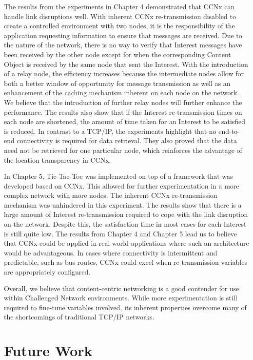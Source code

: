 \documentclass[a4paper,12pt]{report}      %
\begin{document}
The results from the experiments in Chapter 4 demonstrated that CCNx can handle link disruptions well. With inherent CCNx re-transmission
disabled to create a controlled environment with two nodes, it is the responsibility of the application requesting information to ensure that messages are received. Due to the nature of the network, there is no way to verify that Interest messages have been received by the other node except for when the corresponding Content Object is received by the same node that sent the Interest. With the introduction of a relay node, the efficiency increases because the intermediate nodes allow for both a better window of opportunity for message transmission as well as an enhancement of the caching mechanism inherent on each node on the network. We believe that the introduction of further relay nodes will further enhance the performance. The results also show that if the Interest re-transmission times on each node are shortened, the amount of time taken for an Interest to be satisfied is reduced. In contrast to a TCP/IP, the experiments highlight that no end-to-end connectivity is required for data retrieval. They also proved that the data need not be retrieved for one particular node, which reinforces the advantage of the location transparency in CCNx.

In Chapter 5, Tic-Tac-Toe was implemented on top of a framework that was developed based on CCNx. This allowed for further experimentation in a more complex network with more nodes. The inherent CCNx re-transmission mechanism was unhindered in this experiment. The results show that there is a large amount of Interest re-transmission required to cope with the link disruption on the network. Despite this, the satisfaction time in most cases for each Interest is still quite low. The results from Chapter 4 and Chapter 5 lead us to believe that CCNx could be applied in real world applications where such an architecture would be advantageous. In cases where connectivity is intermittent and predictable, such as bus routes, CCNx could excel when re-transmission variables are appropriately configured.

Overall, we believe that content-centric networking is a good contender for use within Challenged Network environments. While more experimentation is still required to fine-tune variables involved, its inherent properties overcome many of the shortcomings of traditional TCP/IP networks. 

\pagebreak
\chapter{Future Work}
\end{document}
